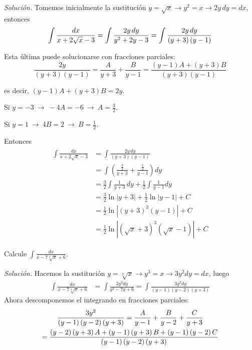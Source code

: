 \emph{Solución.} Tomemos inicialmente la sustitución $y=\sqrt{x}\rightarrow y^{2}=x\rightarrow 2y\,dy=dx$, entonces
\[
  \int \frac{dx}{x+2\sqrt{x}-3}=\int \frac{2y\,dy}{y^{2}+2y-3}=\int \frac{2y\,dy}{%
  \left( y+3\right) \left( y-1\right) }
\]

Esta última puede solucionarse con fracciones parciales:
\[
  \frac{2y}{\left( y+3\right) \left( y-1\right) }=\frac{A}{y+3}+\frac{B}{y-1}=%
  \frac{\left( y-1\right) A+\left( y+3\right) B}{\left( y+3\right) \left(
  y-1\right) }
\]

es decir, $\left( y-1\right) A+\left( y+3\right) B=2y$.

Si $y=-3\ \rightarrow\ -4A=-6\ \rightarrow\ A=\frac{3}{2}$.

Si $y=1\ \rightarrow\ 4B=2\ \rightarrow\ B=\frac{1}{2}$.

Entonces
\begin{gather*}
  \begin{aligned}
    \int \frac{dx}{x+2\sqrt{x}-3}&=\int \frac{2y\,dy}{\left( y+3\right) \left(
    y-1\right) }\\
    &=\int\left(\frac{\frac{3}{2}}{y+3}+\frac{\frac{1}{2}}{y-1}\right) dy\\
    &=\frac{3}{2}\int \frac{1}{y+3}\,dy+ \frac{1}{2}\int\frac{1}{y-1} dy\\
    &=\frac{3}{2}\ln \left\vert y+3\right\vert +\frac{1}{2}\ln\left\vert y-1\right\vert+C\\
    &=\frac{1}{2}\ln \left\vert \left( y+3\right)^{3}\left( y-1\right) \right\vert+C\\
    &=\frac{1}{2}\ln \left\vert \left( \sqrt{x}+3\right)^{3}\left( \sqrt{x}%
    -1\right) \right\vert +C
  \end{aligned}
\end{gather*}

\begin{ejemplo}
  Calcule $\int \frac{dx}{x-7\sqrt[3]{x}+6}$.
\end{ejemplo}
\emph{Solución.} Hacemos la sustitución $y=\sqrt[3]{x} \rightarrow y^{3}=x \rightarrow 3y^{2}dy=dx$, luego
\begin{align*}
  \int \frac{dx}{x-7\sqrt[3]{x}+6}&=\int \frac{3y^{2}dy}{y^{3}-7y+6}=\int
  \frac{3y^{2}dy}{\left( y-1\right) \left( y-2\right) \left( y+3\right) }
\end{align*}
Ahora descomponemos el integrando en fracciones parciales:
\begin{multline*}
  \frac{3y^{2}}{\left( y-1\right) \left( y-2\right) \left( y+3\right) }=\frac{%
  A}{y-1}+\frac{B}{y-2}+\frac{C}{y+3} \\
  =\frac{\left( y-2\right) \left(
    y+3\right) A+\left( y-1\right) \left( y+3\right) B+\left( y-1\right) \left(
  y-2\right) C}{\left( y-1\right) \left( y-2\right) \left( y+3\right) }
\end{multline*}

